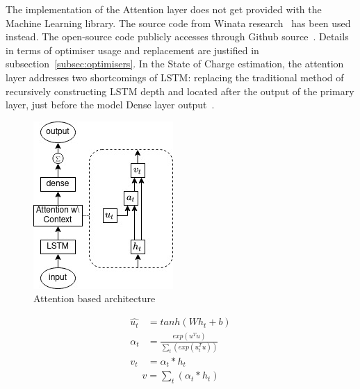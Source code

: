 %
%
The implementation of the Attention layer does not get provided with the Machine Learning library.
The source code from Winata research~\cite{winata_attention-based_2018} has been used instead.
The open-source code publicly accesses through Github source~\cite{attention_8461990}.
Details in terms of optimiser usage and replacement are justified in subsection~\ref{subsec:optimisers}.
In the State of Charge estimation, the attention layer addresses two shortcomings of LSTM: replacing the traditional method of recursively constructing LSTM depth and located after the output of the primary layer, just before the model Dense layer output~\cite{mamo_long_2020}.
\begin{figure}[htbp]
    \centering
    \includegraphics[width=0.35\linewidth]{II_Body/LSTM/images/AttenrionDrawing.jpg}
    \caption{Attention based architecture}
    \label{fig:attention}
\end{figure}
\begin{equation}
    \begin{split}
        \hat{u_t} &= tanh \left(W h_{t} + b \right) \\
             \alpha_t &= \frac{exp(u^T u)}{\sum_t(exp(u_t^T u))} \\
              v_t &= \alpha_t*h_t%
    \end{split}
    \label{eq:AttentionWithContext}
\end{equation}
\begin{equation}
    \begin{split}
        v = \sum_t(\alpha_t * h_t)
    \end{split}
    \label{eq:Addition}
\end{equation}

